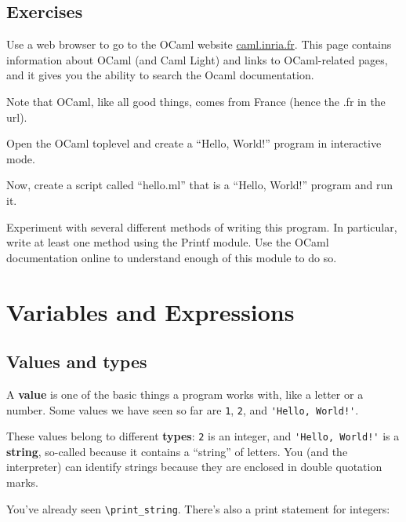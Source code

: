 \documentclass[10pt]{book}
\begin{document}
\section{Exercises}

\begin{ex}
Use a web browser to go to the OCaml website \url{caml.inria.fr}.
This page contains information about OCaml (and Caml Light) and links
to OCaml-related pages, and it gives you the ability to search
the Ocaml documentation.

Note that OCaml, like all good things, comes from France (hence the .fr in the url).

\end{ex}

\begin{ex}
 Open the OCaml toplevel and create a ``Hello, World!'' program in interactive mode.

 Now, create a script called ``hello.ml'' that is a ``Hello, World!'' program and run it.

 Experiment with several different methods of writing this program. In particular,
write at least one method using the Printf module. Use the OCaml documentation online to 
understand enough of this module to do so.
\end{ex}


\chapter{Variables and Expressions}

\section{Values and types}

A {\bf value} is one of the basic things a program works with,
like a letter or a number.  Some values we have seen so far
are {\tt 1}, {\tt 2}, and
\verb"'Hello, World!'".

These values belong to different {\bf types}:
{\tt 2} is an integer, and \verb"'Hello, World!'" is a {\bf string},
so-called because it contains a ``string'' of letters.
You (and the interpreter) can identify
strings because they are enclosed in double quotation marks.


You've already seen \verb"\print_string". There's also a print statement for integers:
\end{document}
